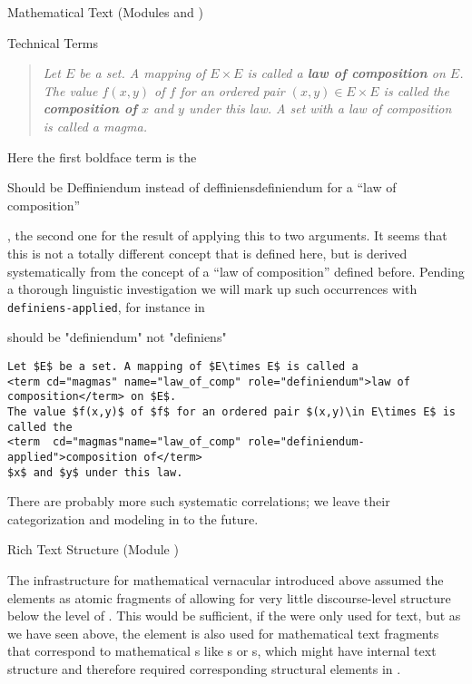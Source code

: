 \begin{tchapter}[id=mtxt,short=Mathematical Text]{Mathematical Text (Modules
  {} and {})}
\begin{tsection}[id=terms]{Technical Terms}
\begin{quote}
  {} {\emph{Let $E$ be a set. A mapping of $E\times E$ is called a {\bf{law
        of composition}} on $E$. The value $f(x,y)$ of $f$ for an ordered pair $(x,y)\in
    E\times E$ is called the {\bf{composition of}} $x$ and $y$ under this law.  A set with
    a law of composition is called a magma.}}
\end{quote}
Here the first boldface term is the \begin{erratum}[reported-by=Gordan Ristovski,date=2008-07-11]{Should be Deffiniendum instead of deffiniens}definiendum for a ``law of composition''\end{erratum}, the second one
for the result of applying this to two arguments. It seems that this is not a totally
different concept that is defined here, but is derived systematically from the concept of
a ``law of composition'' defined before. Pending a thorough linguistic investigation we
will mark up such occurrences with {\tt{definiens-applied}}, for instance in 

\begin{erratum}[reported-by=Krzysztof Retel,date=2006-09-14]{should be "definiendum" not "definiens"}
\begin{lstlisting}[mathescape,caption={Marking up the Technical Terms},label=lst:terms]
Let $E$ be a set. A mapping of $E\times E$ is called a 
<term cd="magmas" name="law_of_comp" role="definiendum">law of composition</term> on $E$. 
The value $f(x,y)$ of $f$ for an ordered pair $(x,y)\in E\times E$ is called the 
<term  cd="magmas"name="law_of_comp" role="definiendum-applied">composition of</term>
$x$ and $y$ under this law.
\end{lstlisting}
\end{erratum}
There are probably more such systematic correlations; we leave their categorization and
modeling in {\omdoc} to the future.
\end{tsection}

\begin{tsection}[id=rt,short=Rich Text Structure]{Rich Text Structure (Module {})}

  The infrastructure for mathematical vernacular introduced above assumed the
  {} elements as atomic fragments of {}
  allowing for very little discourse-level structure below the level of
  {}. This would be sufficient, if the {} were only used for
  text, but as we have seen above, the {} element is also used for
  mathematical text fragments that correspond to mathematical {s} like
  {s} or {s}, which might have internal text
  structure and therefore required corresponding structural elements in {\omdoc}.


\end{tsection}
\end{tchapter}
